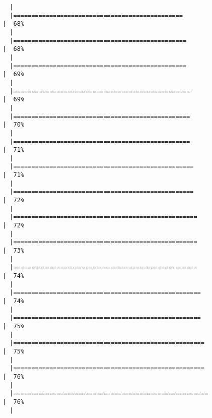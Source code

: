 \documentclass[12pt]{article}
\begin{document}
\begin{verbatim}
  |                                                                            
  |===============================================                       |  68%
  |                                                                            
  |================================================                      |  68%
  |                                                                            
  |================================================                      |  69%
  |                                                                            
  |=================================================                     |  69%
  |                                                                            
  |=================================================                     |  70%
  |                                                                            
  |=================================================                     |  71%
  |                                                                            
  |==================================================                    |  71%
  |                                                                            
  |==================================================                    |  72%
  |                                                                            
  |===================================================                   |  72%
  |                                                                            
  |===================================================                   |  73%
  |                                                                            
  |===================================================                   |  74%
  |                                                                            
  |====================================================                  |  74%
  |                                                                            
  |====================================================                  |  75%
  |                                                                            
  |=====================================================                 |  75%
  |                                                                            
  |=====================================================                 |  76%
  |                                                                            
  |======================================================                |  76%
  |                                                                            

\end{verbatim}
\end{document}
